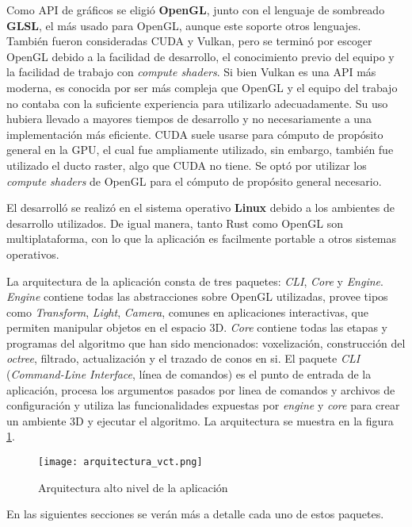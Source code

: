 Como API de gráficos se eligió \textbf{OpenGL}, junto con el lenguaje de sombreado \textbf{GLSL}, el más usado para OpenGL, aunque este soporte otros lenguajes.
También fueron consideradas CUDA y Vulkan, pero se terminó por escoger OpenGL debido a la facilidad de desarrollo, el conocimiento previo del equipo y la facilidad de trabajo con \textit{compute shaders}.
Si bien Vulkan es una API más moderna, es conocida por ser más compleja que OpenGL y el equipo del trabajo no contaba con la suficiente experiencia para utilizarlo adecuadamente.
Su uso hubiera llevado a mayores tiempos de desarrollo y no necesariamente a una implementación más eficiente.
CUDA suele usarse para cómputo de propósito general en la GPU, el cual fue ampliamente utilizado, sin embargo, también fue utilizado el ducto raster, algo que CUDA no tiene.
Se optó por utilizar los \textit{compute shaders} de OpenGL para el cómputo de propósito general necesario.

El desarrolló se realizó en el sistema operativo \textbf{Linux} debido a los ambientes de desarrollo utilizados.
De igual manera, tanto Rust como OpenGL son multiplataforma, con lo que la aplicación es facilmente portable a otros sistemas operativos.

La arquitectura de la aplicación consta de tres paquetes: \textit{CLI}, \textit{Core} y \textit{Engine}.
\textit{Engine} contiene todas las abstracciones sobre OpenGL utilizadas, provee tipos como \textit{Transform}, \textit{Light}, \textit{Camera}, comunes en aplicaciones interactivas, que permiten manipular objetos en el espacio 3D.
\textit{Core} contiene todas las etapas y programas del algoritmo que han sido mencionados: voxelización, construcción del \textit{octree}, filtrado, actualización y el trazado de conos en si.
El paquete \textit{CLI} (\textit{Command-Line Interface}, línea de comandos) es el punto de entrada de la aplicación, procesa los argumentos pasados por linea de comandos y archivos de configuración y utiliza las funcionalidades expuestas por \textit{engine} y \textit{core} para crear un ambiente 3D y ejecutar el algoritmo.
La arquitectura se muestra en la figura \ref{fig:overall_architecture}.

\begin{figure}
    \centering
    \texttt{[image: arquitectura\_vct.png]}
    \caption{Arquitectura alto nivel de la aplicación}
    \label{fig:overall_architecture}
\end{figure}

En las siguientes secciones se verán más a detalle cada uno de estos paquetes.


